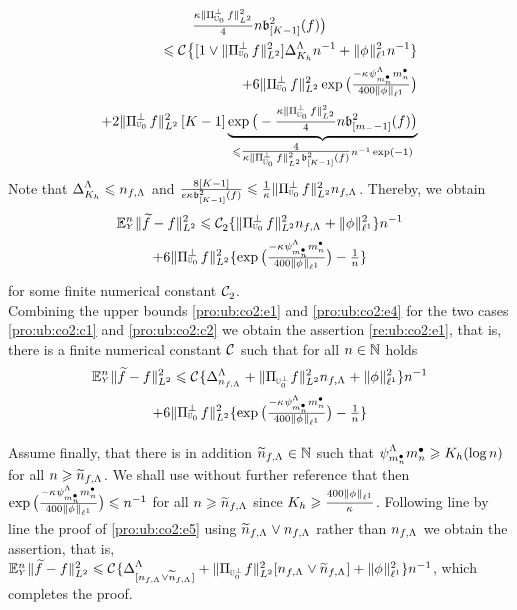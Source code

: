 \begin{pro}
\begin{multline}
    \tfrac{\rWc\VnormLp{\Proj[{\mHiH[0]}]^\perp\xdf}^2}{4}\ssY\bias[{[K-1]}]^2(\xdf)\big)\\\hfill
\leq\cst{}\big\{
[1\vee\VnormLp{\Proj[{\mHiH[0]}]^\perp\xdf}^2]\DipenSv[K_{\ydf}]\ssY^{-1}+\Vnormlp[1]{\fydf}^2
\ssY^{-1}\}\\\hfill
+6\VnormLp{\Proj[{\mHiH[0]}]^\perp\xdf}^2 \exp\big(\tfrac{-\cpen\cmSv[\sDi{\ssY}]\sDi{\ssY}}{400\Vnormlp[1]{\fydf}}\big)
\\\hfill
+2\VnormLp{\Proj[{\mHiH[0]}]^\perp\xdf}^2\,[K-1]\underbrace{\exp\big(-\tfrac{\rWc\VnormLp{\Proj[{\mHiH[0]}]^\perp\xdf}^2}{4}\ssY\bias[{[\mDi-1]}]^2(\xdf)\big)}_{\leq
  \tfrac{4}{\rWc\VnormLp{\Proj[{\mHiH[0]}]^\perp\xdf}^2\bias[{[K-1]}]^2(\xdf)}\ssY^{-1}\exp(-1)}
\end{multline}
Note that $\DipenSv[K_{\ydf}]\leq\ssY_{\xdf,\iSv}$ and
$\tfrac{8[K-1]}{e\rWc\bias[{[K-1]}]^2(\xdf)}\leq\tfrac{1}{\rWc}\VnormLp{\Proj[{\mHiH[0]}]^\perp\xdf}^2\ssY_{\xdf,\iSv}$. Thereby,
we obtain 
\begin{multline}\label{pro:ub:co2:e4}
\FuEx[\ssY]{\rY}\VnormLp{\txdf-\xdf}^2
\leq\cst{2}\{\VnormLp{\Proj[{\mHiH[0]}]^\perp\xdf}^2\ssY_{\xdf,\iSv}+ \Vnormlp[1]{\fydf}^2\}\ssY^{-1}\\
+ 6\VnormLp{\Proj[{\mHiH[0]}]^\perp\xdf}^2\{ \exp\big(\tfrac{-\cpen\cmSv[\sDi{\ssY}]\sDi{\ssY}}{400\Vnormlp[1]{\fydf}}\big)-\tfrac{1}{\ssY}\}
 \end{multline}
for some finite numerical constant $\cst{2}$.\\
Combining
the upper bounds 
\eqref{pro:ub:co2:e1} and
\eqref{pro:ub:co2:e4} for the two
cases \ref{pro:ub:co2:c1} and \ref{pro:ub:co2:c2}  we obtain the
assertion \eqref{re:ub:co2:e1}, that is, there is a finite numerical
constant $\cst{}$ such that  for all
$\ssY\in\Nz$ holds
\begin{multline}\label{pro:ub:co2:e5}
\FuEx[\ssY]{\rY}\VnormLp{\txdf-\xdf}^2
\leq\cst{}\{\DipenSv[\ssY_{\xdf,\iSv}]+\VnormLp{\Proj[{\mHiH[0]^\perp}]\xdf}^2\ssY_{\xdf,\iSv}+ \Vnormlp[1]{\fydf}^2\}\ssY^{-1}\\
+ 6\VnormLp{\Proj[{\mHiH[0]}]^\perp\xdf}^2\{ \exp\big(\tfrac{-\cpen\cmSv[\sDi{\ssY}]\sDi{\ssY}}{400\Vnormlp[1]{\fydf}}\big)-\tfrac{1}{\ssY}\}
\end{multline}

Assume finally, that there is in addition
$\widetilde{\ssY}_{\xdf,\iSv}\in\Nz$ such that
$\cmiSv[\sDi{\ssY}]\sDi{\ssY}\geq K_{\ydf}(\log\ssY)$ for all
$\ssY\geq\widetilde{\ssY}_{\xdf,\iSv}$. We shall use without further
reference that then $\exp\big(\tfrac{-\cpen\cmSv[\sDi{\ssY}]\sDi{\ssY}}{400\Vnormlp[1]{\fydf}}\big)\leq\ssY^{-1}$ for
all $\ssY\geq\widetilde{\ssY}_{\xdf,\iSv}$ since $K_{\ydf}\geq
\tfrac{400\Vnormlp[1]{\fydf}}{\cpen}$. Following line by line the
proof of \eqref{pro:ub:co2:e5} using
$\widetilde{\ssY}_{\xdf,\iSv}\vee\ssY_{\xdf,\iSv}$  rather than
$\ssY_{\xdf,\iSv}$  we obtain the
assertion, that is,
$\FuEx[\ssY]{\rY}\VnormLp{\txdf-\xdf}^2
\leq\cst{}\{\DipenSv[{[\ssY_{\xdf,\iSv}\vee\widetilde{\ssY}_{\xdf,\iSv}]}]+\VnormLp{\Proj[{\mHiH[0]^\perp}]\xdf}^2[\ssY_{\xdf,\iSv}\vee\widetilde{\ssY}_{\xdf,\iSv}]+ \Vnormlp[1]{\fydf}^2\}\ssY^{-1}$, which completes the proof.
\end{pro}